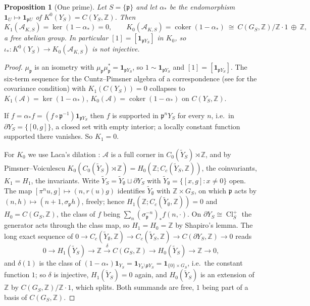 \documentclass[11pt]{amsart}
\numberwithin{equation}{section}
\newtheorem{proposition}[theorem]{Proposition}
\theoremstyle{definition}
\theoremstyle{remark}
\newcommand{\Z}{\mathbb{Z}}
\newcommand{\cA}{\mathcal{A}}
\newcommand{\pp}{\mathfrak{p}}
\newcommand{\Cl}{\operatorname{Cl}}
\newcommand{\coker}{\operatorname{coker}}
\begin{document}
\begin{proposition}[One prime]\label{prop:K}
Let $S=\{\pp\}$ and let $\alpha_*$ be the endomorphism $\mathbf 1_U\mapsto\mathbf 1_{\pp U}$
of $K^0(Y_S)=C(Y_S,\Z)$. Then
\begin{equation}\label{eq:K}
K_1(\cA_{K,S})=\ker(1-\alpha_*)=0,
\qquad
K_0(\cA_{K,S})=\coker(1-\alpha_*)\ \cong\ C(G_S,\Z)\big/\Z\cdot1\ \oplus\ \Z ,
\end{equation}
a free abelian group. In particular $[1]=[\mathbf 1_{\pp Y_S}]$ in $K_0$, so
$\iota_*:K^0(Y_S)\to K_0(\cA_{K,S})$ is \emph{not} injective.
\end{proposition}

\begin{proof}
$\mu_\pp$ is an isometry with $\mu_\pp\mu_\pp^*=\mathbf 1_{\pp Y_S}$, so
$1\sim\mathbf 1_{\pp Y_S}$ and $[1]=[\mathbf 1_{\pp Y_S}]$. The six-term sequence for the
Cuntz--Pimsner algebra of a correspondence \cite[\S4]{Pimsner} (see \cite{Katsura} for the
covariance condition) with $K_1(C(Y_S))=0$ collapses to
$K_1(\cA)=\ker(1-\alpha_*)$, $K_0(\cA)=\coker(1-\alpha_*)$ on $C(Y_S,\Z)$.

If $f=\alpha_*f=(f\circ\pp^{-1})\mathbf 1_{\pp Y_S}$ then $f$ is supported in $\pp^nY_S$
for every $n$, i.e.\ in $\partial Y_S=\{[0,g]\}$, a closed set with empty interior; a
locally constant function supported there vanishes. So $K_1=0$.

For $K_0$ we use Laca's dilation \cite{Laca}: $\cA$ is a full corner in
$C_0(\widetilde Y_S)\rtimes\Z$, and by Pimsner--Voiculescu \cite{PV}
$K_0(C_0(\widetilde Y_S)\rtimes\Z)=H_0(\Z;C_c(\widetilde Y_S,\Z))$, the coinvariants,
$K_1=H_1$, the invariants. Write $\widetilde Y_S=\widetilde Y_\emptyset\sqcup\partial Y_S$
with $\widetilde Y_\emptyset=\{[x,g]:x\ne0\}$ open. The map
$[\pi^nu,g]\mapsto(n,r(u)g)$ identifies $\widetilde Y_\emptyset$ with $\Z\times G_S$, on which
$\pp$ acts by $(n,h)\mapsto(n+1,\sigma_\pp h)$, freely; hence
$H_1(\Z;C_c(\widetilde Y_\emptyset,\Z))=0$ and $H_0=C(G_S,\Z)$, the class of $f$ being
$\sum_n(\sigma_\pp^{-n})_*f(n,\cdot)$. On $\partial Y_S\cong\Cl^+_S$ the generator acts
through the class map, so $H_1=H_0=\Z$ by Shapiro's lemma. The long exact sequence of
$0\to C_c(\widetilde Y_\emptyset,\Z)\to C_c(\widetilde Y_S,\Z)\to C(\partial Y_S,\Z)\to0$
reads
\[
0\to H_1(\widetilde Y_S)\to\Z\xrightarrow{\ \delta\ }C(G_S,\Z)\to H_0(\widetilde Y_S)\to\Z\to0,
\]
and $\delta(1)$ is the class of $(1-\alpha_*)\mathbf 1_{Y_S}=\mathbf 1_{Y_S\setminus\pp Y_S}
=\mathbf 1_{\{0\}\times G_S}$, i.e.\ the constant function $1$; so $\delta$ is injective,
$H_1(\widetilde Y_S)=0$ again, and $H_0(\widetilde Y_S)$ is an extension of $\Z$ by
$C(G_S,\Z)/\Z\cdot1$, which splits. Both summands are free, $1$ being part of a basis of
$C(G_S,\Z)$.
\end{proof}
\end{document}
